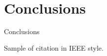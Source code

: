 \chapter{Conclusions}

Conclusions

Sample of citation \cite{DBLP:journals/sigcas/X91} in IEEE style.